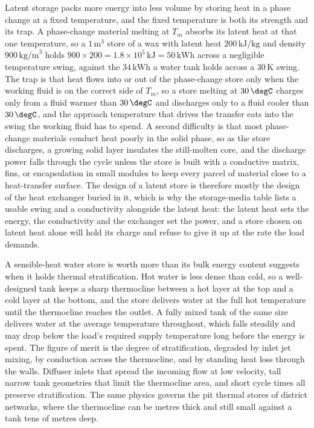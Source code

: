 Latent storage packs more energy into less volume by storing heat in a phase change
at a fixed temperature, and the fixed temperature is both its strength and its
trap. A phase-change material melting at $T_m$ absorbs its latent heat at that one
temperature, so a $1\,\text{m}^3$ store of a wax with latent heat $200\,\text{kJ/kg}$
and density $900\,\text{kg/m}^3$ holds $900\times 200 = 1.8\times 10^5\,\text{kJ} =
50\,\text{kWh}$ across a negligible temperature swing, against the $34\,\text{kWh}$
a water tank holds across a $30\,\si{\kelvin}$ swing. The trap is that heat flows
into or out of the phase-change store only when the working fluid is on the correct
side of $T_m$, so a store melting at $30\,\degC$ charges only from a fluid warmer
than $30\,\degC$ and discharges only to a fluid cooler than $30\,\degC$, and the
approach temperature that drives the transfer eats into the swing the working fluid
has to spend. A second difficulty is that most phase-change materials conduct heat
poorly in the solid phase, so as the store discharges, a growing solid layer
insulates the still-molten core, and the discharge power falls through the cycle
unless the store is built with a conductive matrix, fins, or encapsulation in small
modules to keep every parcel of material close to a heat-transfer surface. The
design of a latent store is therefore mostly the design of the heat exchanger
buried in it, which is why the storage-media table lists a usable swing and a
conductivity alongside the latent heat: the latent heat sets the energy, the
conductivity and the exchanger set the power, and a store chosen on latent heat
alone will hold its charge and refuse to give it up at the rate the load demands.

\begin{mastery}
A sensible-heat water store is worth more than its bulk energy content
suggests when it holds thermal stratification. Hot water is less dense
than cold, so a well-designed tank keeps a sharp thermocline between a
hot layer at the top and a cold layer at the bottom, and the store
delivers water at the full hot temperature until the thermocline
reaches the outlet. A fully mixed tank of the same size delivers water
at the average temperature throughout, which falls steadily and may
drop below the load's required supply temperature long before the
energy is spent. The figure of merit is the degree of stratification,
degraded by inlet jet mixing, by conduction across the thermocline, and
by standing heat loss through the walls. Diffuser inlets that spread
the incoming flow at low velocity, tall narrow tank geometries that
limit the thermocline area, and short cycle times all preserve
stratification. The same physics governs the pit thermal stores of
district networks, where the thermocline can be metres thick and still
small against a tank tens of metres deep.
\end{mastery}

